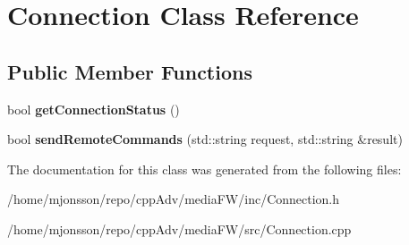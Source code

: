 \hypertarget{classConnection}{}\section{Connection Class Reference}
\label{classConnection}
\subsection*{Public Member Functions}
\begin{DoxyCompactItemize}
\item 
\mbox{\label{classConnection_a4cbf33699e3ca42a23eb8168be4d5287}} 
bool {\bfseries get\+Connection\+Status} ()
\item 
\mbox{\label{classConnection_ab59a9e6d364eff3f116e60b6ccc60f1b}} 
bool {\bfseries send\+Remote\+Commands} (std\+::string request, std\+::string \&result)
\end{DoxyCompactItemize}


The documentation for this class was generated from the following files\+:\begin{DoxyCompactItemize}
\item 
/home/mjonsson/repo/cpp\+Adv/media\+F\+W/inc/Connection.\+h\item 
/home/mjonsson/repo/cpp\+Adv/media\+F\+W/src/Connection.\+cpp\end{DoxyCompactItemize}
